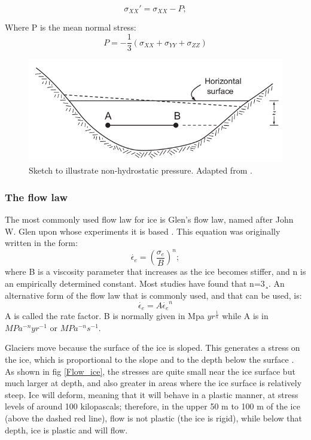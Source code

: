\documentclass{article}
\begin{document}
\begin{equation}
	\sigma_{XX}'= \sigma_{XX}-P;
\end{equation}

Where P is the mean normal stress:
\begin{equation}
	P=-\frac{1}{3}({\sigma_{XX}+\sigma_{YY}+\sigma_{ZZ}})
\end{equation}

\begin{figure}[!h]
	\centering
	\includegraphics[width=0.7\linewidth]{../fig/Non_hydrostatic_pressure.png}
	\caption{Sketch to illustrate non-hydrostatic pressure. Adapted from \cite{hooke2019principles}.}
	\label{Deviatoric_stress}
\end{figure}

\subsubsection{The flow law}

The most commonly used ﬂow law for ice is Glen’s ﬂow law, named after John
W. Glen upon whose experiments it is based \cite{glen1958flow}. This equation was originally written in the form:
\begin{equation}
	\dot{\epsilon_{e}}=({\frac{\sigma_{e}}{B}})^n;
\end{equation}
where B is a viscosity parameter that increases as the ice becomes stiffer, and n is an empirically determined constant. Most studies have found that n=3¸. An alternative form of the ﬂow law that is commonly used, and that can be used, is:
\begin{equation}
	\dot{\epsilon_{e}}=A\dot{\epsilon_{e}}^n
\end{equation}
A is called the rate factor. B is normally given in Mpa $yr^{\frac{1}{n}}$ while A is in $MPa^{-n} yr ^{-1}$ or $MPa^{-n} s ^{-1}$.

Glaciers move because the surface of the ice is sloped. This generates a stress on the ice, which is proportional to the slope and to the depth below the surface \cite[]{earle2015physical}. As shown in fig \ref{Flow_ice}, the stresses are quite small near the ice surface but much larger at depth, and also greater in areas where the ice surface is relatively steep. Ice will deform, meaning that it will behave in a plastic manner, at stress levels of around 100 kilopascals; therefore, in the upper 50 m to 100 m of the ice (above the dashed red line), flow is not plastic (the ice is rigid), while below that depth, ice is plastic and will flow.
\end{document}
